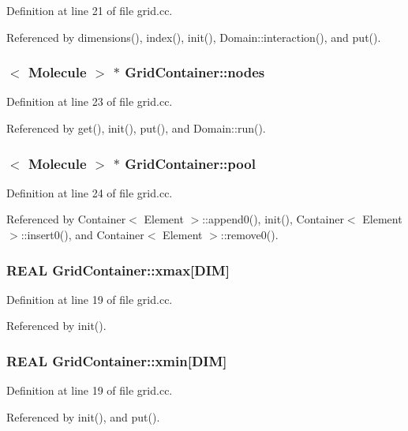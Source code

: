 Definition at line 21 of file grid.cc.

Referenced by dimensions(), index(), init(), Domain::interaction(), and put().\hypertarget{namespaceGridContainer_f133b78cfcbc65fd7a2aa94d8867cd60}{
\subsubsection[{nodes}]{$<$ {\bf Molecule} $>$ $\ast$ {\bf GridContainer::nodes}}}
\label{namespaceGridContainer_f133b78cfcbc65fd7a2aa94d8867cd60}




Definition at line 23 of file grid.cc.

Referenced by get(), init(), put(), and Domain::run().\hypertarget{namespaceGridContainer_27a1b54d99c94cfc62e5d3ab30ea42d6}{
\subsubsection[{pool}]{$<$ {\bf Molecule} $>$ $\ast$ {\bf GridContainer::pool}}}
\label{namespaceGridContainer_27a1b54d99c94cfc62e5d3ab30ea42d6}




Definition at line 24 of file grid.cc.

Referenced by Container$<$ Element $>$::append0(), init(), Container$<$ Element $>$::insert0(), and Container$<$ Element $>$::remove0().\hypertarget{namespaceGridContainer_9d067700316c122f755f39a295b26403}{
\subsubsection[{xmax}]{\setlength{\rightskip}{0pt plus 5cm}REAL {\bf GridContainer::xmax}\mbox{[}DIM\mbox{]}}}
\label{namespaceGridContainer_9d067700316c122f755f39a295b26403}




Definition at line 19 of file grid.cc.

Referenced by init().\hypertarget{namespaceGridContainer_3add3b47160eb8fbc418f8ac3fd814ca}{
\subsubsection[{xmin}]{\setlength{\rightskip}{0pt plus 5cm}REAL {\bf GridContainer::xmin}\mbox{[}DIM\mbox{]}}}
\label{namespaceGridContainer_3add3b47160eb8fbc418f8ac3fd814ca}




Definition at line 19 of file grid.cc.

Referenced by init(), and put().
